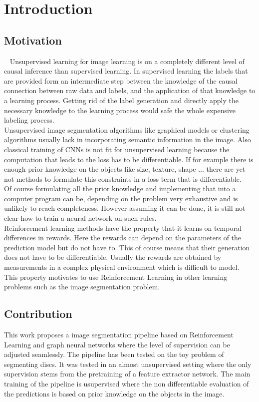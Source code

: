 \chapter{Introduction}
\section{Motivation}~\label{chap:motivation}
Unsupervised learning for image learning is on a completely different level of causal inference than supervised learning. In supervised learning the labels that are provided form an intermediate step between the knowledge of the causal connection between raw data and labels, and the application of that knowledge to a learning process. Getting rid of the label generation and directly apply the necessary knowledge to the learning process would safe the whole expensive labeling process.\\
Unsupervised image segmentation algorithms like graphical models or clustering algorithms usually lack in incorporating semantic information in the image. Also classical training of CNNs is not fit for unsupervised learning because the computation that leads to the loss has to be differentiable. If for example there is enough prior knowledge on the objects like size, texture, shape ... there are yet not methods to formulate this constraints in a loss term that is differentiable.\\
Of course formulating all the prior knowledge and implementing that into a computer program can be, depending on the problem very exhaustive and is unlikely to reach completeness. However assuming it can be done, it is still not clear how to train a neural network on such rules.\\
Reinforcement learning methods have the property that it learns on temporal differences in rewards. Here the rewards can depend on the parameters of the prediction model but do not have to. This of course means that their generation does not have to be differentiable. Usually the rewards are obtained by measurements in a complex physical environment which is difficult to model.\\
This property motivates to use Reinforcement Learning in other learning problems such as the image segmentation problem.

\section{Contribution}
This work proposes a image segmentation pipeline based on Reinforcement Learning and graph neural networks where the level of supervision can be adjusted seamlessly. The pipeline has been tested on the toy problem of segmenting discs. It was tested in an almost unsupervised setting where the only supervision stems from the pretraining of a feature extractor network. The main training of the pipeline is usupervised where the non differentiable evaluation of the predictions is based on prior knowledge on the objects in the image.